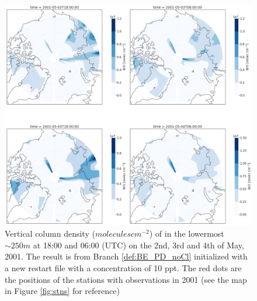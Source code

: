 \begin{figure}[h]
    \centering
    \includegraphics[width=\linewidth]{Chapter6_Results/images/Polar_StationComp_2001/BrO/polarBro_newRestart.png}
    \caption{Vertical column density ($molecules cm^{-2}$) of  in the lowermost $\sim 250 m$ at 18:00 and 06:00 (UTC) on the  2nd, 3rd and 4th of May, 2001. The result is from Branch \ref{def:BE_PD_noCl} initialized with a new restart file with a  concentration of 10 ppt. The red dots are the positions of the stations with observations in 2001 (see the map in Figure \ref{fig:stns} for reference)}
    \label{fig:polarBro_newRestart}
\end{figure}